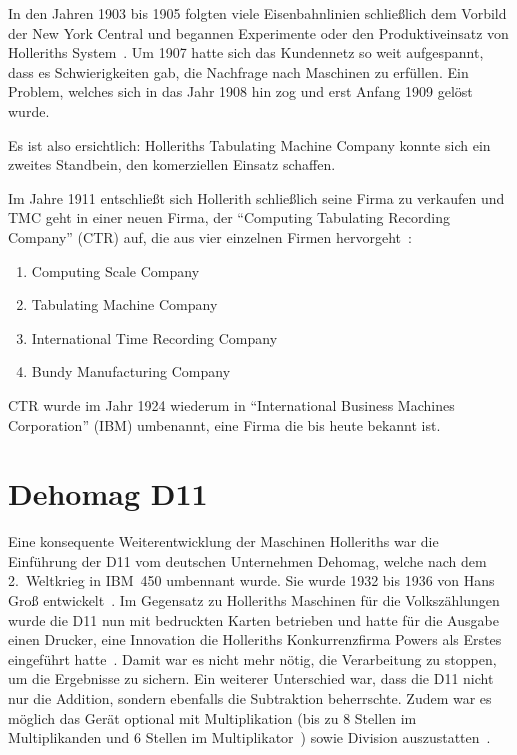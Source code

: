 \documentclass[parskip=half]{scrartcl}
\begin{document}
In den Jahren 1903 bis 1905 folgten viele Eisenbahnlinien schließlich dem
Vorbild der New York Central und begannen Experimente oder den Produktiveinsatz von
Holleriths System~\cite{austrian1982herman}. Um 1907 hatte sich das Kundennetz
so weit aufgespannt, dass es Schwierigkeiten gab, die Nachfrage nach Maschinen
zu erfüllen. Ein Problem, welches sich in das Jahr 1908 hin zog und erst Anfang
1909 gelöst wurde.

Es ist also ersichtlich: Holleriths Tabulating Machine Company konnte sich ein
zweites Standbein, den komerziellen Einsatz schaffen.

Im Jahre 1911 entschließt sich Hollerith schließlich seine Firma zu verkaufen
und TMC geht in einer neuen Firma, der \enquote{Computing Tabulating Recording
Company} (CTR) auf, die aus vier einzelnen Firmen
hervorgeht~\cite{austrian1982herman}:

\begin{enumerate}
  \item Computing Scale Company
  \item Tabulating Machine Company
  \item International Time Recording Company
  \item Bundy Manufacturing Company
\end{enumerate}

CTR wurde im Jahr 1924 wiederum in \enquote{International Business Machines
Corporation} (IBM) umbenannt, eine Firma die bis heute bekannt ist.

\section{Dehomag D11}
\label{sec:d11}

Eine konsequente Weiterentwicklung der Maschinen Holleriths war die Einführung
der D11 vom deutschen Unternehmen Dehomag, welche nach dem 2.~Weltkrieg in
IBM~450 umbennant wurde. Sie wurde 1932 bis 1936 von Hans Groß
entwickelt~\cite{deutschesMuseum}. Im Gegensatz zu Holleriths Maschinen für die
Volkszählungen wurde die D11 nun mit bedruckten Karten betrieben und hatte für
die Ausgabe einen Drucker, eine Innovation die Holleriths Konkurrenzfirma Powers als
Erstes eingeführt hatte~\cite{austrian1982herman}. Damit war es nicht mehr
nötig, die Verarbeitung zu stoppen, um die Ergebnisse zu sichern. Ein weiterer
Unterschied war, dass die D11 nicht nur die Addition, sondern ebenfalls
die Subtraktion beherrschte. Zudem war es möglich das Gerät optional mit
Multiplikation (bis zu 8 Stellen im Multiplikanden und 6 Stellen im
Multiplikator~\cite{rojas2002first}) sowie Division
auszustatten~\cite{deutschesMuseum}.
\end{document}
